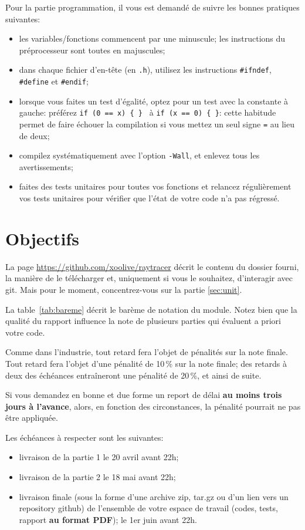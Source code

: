 \documentclass[10pt, a4paper ]{article}
\begin{document}
Pour la partie programmation, il vous est demandé de suivre les bonnes pratiques
suivantes:
\begin{itemize}
    \item les variables/fonctions commencent par une minuscule; les instructions
        du préprocesseur sont toutes en majuscules;
    \item dans chaque fichier d'en-tête (en \texttt{.h}), utilisez les
        instructions \texttt{\#ifndef}, \texttt{\#define} et \texttt{\#endif};
    \item lorsque vous faites un test d'égalité, optez pour un test avec la
        constante à gauche: préférez \texttt{if (0 == x) \{ \} } à
        \texttt{if (x == 0) \{ \}}: cette habitude permet de faire échouer la
        compilation si vous mettez un seul signe \texttt{=} au lieu de deux;
    \item compilez systématiquement avec l'option \texttt{-Wall}, et enlevez
        tous les avertissements;
    \item faites des tests unitaires pour toutes vos fonctions et relancez
        régulièrement vos tests unitaires pour vérifier que l'état de votre code
        n'a pas régressé.
\end{itemize}


\section{Objectifs}

La page \url{https://github.com/xoolive/raytracer} décrit le contenu du dossier
fourni, la manière de le télécharger et, uniquement si vous le souhaitez,
d'interagir avec git. Mais pour le moment, concentrez-vous sur la partie
\ref{sec:unit}.

La table~\ref{tab:bareme} décrit le barème de notation du module. Notez bien que
la qualité du rapport influence la note de plusieurs parties qui évaluent a
priori votre code.

Comme dans l'industrie, tout retard fera l'objet de pénalités sur la note
finale. Tout retard fera l'objet d'une pénalité de 10\,\% sur la note finale;
des retards à deux des échéances entraîneront une pénalité de 20\,\%, et ainsi
de suite.

Si vous demandez en bonne et due forme un report de délai \textbf{au moins trois
jours à l'avance}, alors, en fonction des circonstances, la pénalité pourrait
ne pas être appliquée.

Les échéances à respecter sont les suivantes:
\begin{itemize}
    \item livraison de la partie 1 le 20 avril avant 22h;
    \item livraison de la partie 2 le 18 mai avant 22h;
    \item livraison finale (sous la forme d'une archive zip, tar.gz ou d'un lien
        vers un repository github) de l'ensemble de votre espace de travail
        (codes, tests, rapport \textbf{au format PDF}); le 1er juin avant 22h.
\end{itemize}
\end{document}
